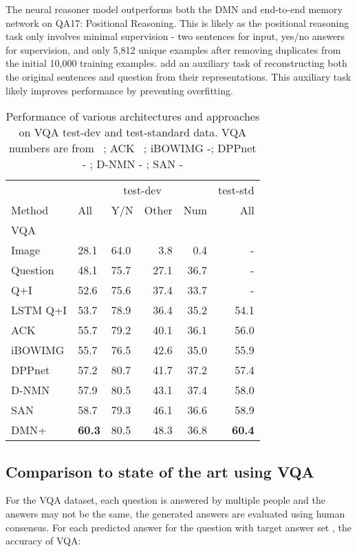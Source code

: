 \documentclass{article}
\begin{document}
The neural reasoner model outperforms both the DMN and end-to-end memory network on QA17: Positional Reasoning.
This is likely as the positional reasoning task only involves minimal supervision - two sentences for input, yes/no answers for supervision, and only 5,812 unique examples after removing duplicates from the initial 10,000 training examples.
\citet{Peng2015} add an auxiliary task of reconstructing both the original sentences and question from their representations.
This auxiliary task likely improves performance by preventing overfitting.



\begin{table}[t!]

\centering
\setlength{\tabcolsep}{.5em}
\begin{tabular}{lllrrr}
\hline
\multicolumn{1}{c}{}&
\multicolumn{4}{c}{test-dev}&
\multicolumn{1}{r}{test-std}\\
\cline{2-5}
Method&All&Y/N&Other&Num&All\\
\hline
VQA& & & & &\\
Image&28.1&64.0 &3.8 &0.4 &-\\
Question &48.1&75.7 &27.1 &36.7&-\\
Q+I&52.6&75.6 &37.4 &33.7 &-\\
LSTM Q+I&53.7&78.9 &36.4 &35.2 &54.1\\
\hline
ACK&55.7&79.2 &40.1 &36.1 &56.0\\
iBOWIMG&55.7&76.5 &42.6 &35.0 &55.9\\
DPPnet&57.2&80.7 &41.7 &37.2 &57.4\\
D-NMN&57.9&80.5 &43.1 &37.4 &58.0\\
SAN&58.7&79.3 &46.1 &36.6 &58.9\\
\hline
DMN+&\textbf{60.3}&80.5 &48.3 &36.8 &\textbf{60.4}\\
\end{tabular}
\caption{Performance of various architectures and approaches on VQA test-dev and test-standard data. VQA numbers are from ~\citet{Antol2015};  ACK ~\citet{wu2015ask}; iBOWIMG -\citet{Zhou2015}; DPPnet - \citet{noh2015image}; D-NMN - \citet{andreas2016learning}; SAN -\citet{yang2015stacked} }
\label{quantitative}
\end{table}


\subsection{Comparison to state of the art using VQA} \label{sec:vqa-sota}
For the VQA dataset, each question is answered by multiple people and the answers may not be the same, the generated answers are evaluated using human consensus.
For each predicted answer  for the  question with target answer set , the accuracy of VQA:
\end{document}
